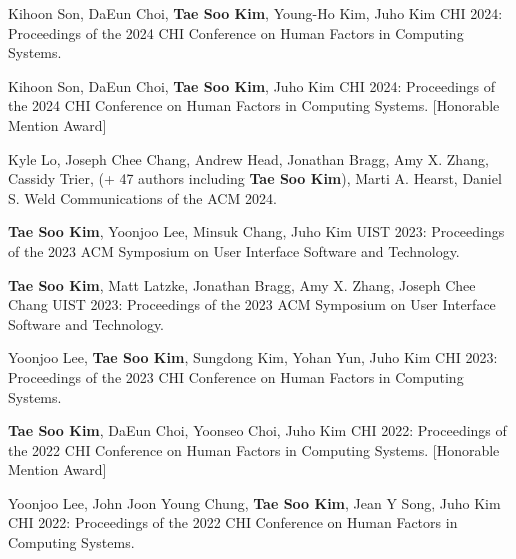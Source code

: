 \documentclass[10pt,a4paper]{article}
\newcommand{\me}{\textbf{Tae Soo Kim}}
\newenvironment{publist}{%
  \begin{list}{}{%
    \setlength{\leftmargin}{30.7pt}%
    \setlength{\labelwidth}{25.7pt}%
    \setlength{\labelsep}{5pt}%
    \setlength{\itemsep}{5.8pt}%
    \setlength{\parsep}{0pt}%
    \setlength{\topsep}{4.7pt}%
    \setlength{\partopsep}{0pt}}%
  \fontsize{10}{13.2}\selectfont\raggedright\interlinepenalty=10000\relax}{\end{list}}
\begin{document}
\begin{publist}
{Kihoon Son, DaEun Choi, \me, Young-Ho Kim, Juho Kim}
{CHI 2024: Proceedings of the 2024 CHI Conference on Human Factors in Computing Systems.}

{Kihoon Son, DaEun Choi, \me, Juho Kim}
{CHI 2024: Proceedings of the 2024 CHI Conference on Human Factors in Computing Systems.}
[Honorable Mention Award]

{Kyle Lo, Joseph Chee Chang, Andrew Head, Jonathan Bragg, Amy X. Zhang, Cassidy Trier, (+ 47 authors including \me), Marti A. Hearst, Daniel S. Weld}
{Communications of the ACM 2024.}

{\me, Yoonjoo Lee, Minsuk Chang, Juho Kim}
{UIST 2023: Proceedings of the 2023 ACM Symposium on User Interface Software and Technology.}

{\me, Matt Latzke, Jonathan Bragg, Amy X. Zhang, Joseph Chee Chang}
{UIST 2023: Proceedings of the 2023 ACM Symposium on User Interface Software and Technology.}

{Yoonjoo Lee, \me, Sungdong Kim, Yohan Yun, Juho Kim}
{CHI 2023: Proceedings of the 2023 CHI Conference on Human Factors in Computing Systems.}

{\me, DaEun Choi, Yoonseo Choi, Juho Kim}
{CHI 2022: Proceedings of the 2022 CHI Conference on Human Factors in Computing Systems.}
[Honorable Mention Award]

{Yoonjoo Lee, John Joon Young Chung, \me, Jean Y Song, Juho Kim}
{CHI 2022: Proceedings of the 2022 CHI Conference on Human Factors in Computing Systems.}


\end{publist}
\end{document}
